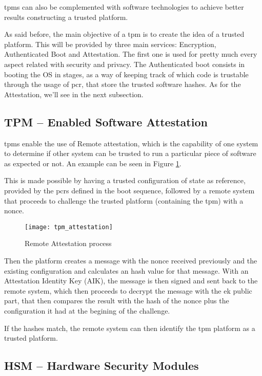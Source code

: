 \gls{tpm}s can also be complemented with software technologies to achieve better results constructing a trusted platform. 

As said before, the main objective of a \gls{tpm} is to create the idea of a trusted platform. This will be  provided by three main services: Encryption, Authenticated Boot and Attestation. The first one is used for pretty much every aspect related with security and privacy. The Authenticated boot consists in booting the OS in stages, as a way of keeping track of which code is trustable through the usage of \gls{pcr}, that store the trusted software hashes. As for the Attestation, we'll see in the next subsection.


\subsection{TPM – Enabled Software Attestation}
\label{ssec:tpm_attest}

\gls{tpm}s enable the use of Remote attestation, which is the capability of one system to determine if other system can be trusted to run a particular piece of software as expected or not. An example can be seen in Figure \ref{fig:tpm_attestation}.

This is made possible by having a trusted configuration of state as reference, provided by the \gls{pcr}s defined in the boot sequence, followed by a remote system that proceeds to challenge the trusted platform (containing the \gls{tpm}) with a nonce. 

\begin{figure}[htbp]
	\centering
	{\texttt{[image: tpm\_attestation]}}%
	\caption{Remote Attestation process}
	\label{fig:tpm_attestation}
\end{figure}

Then the platform creates a message with the nonce received previously and the existing configuration and calculates an hash value for that message. With an Attestation Identity Key (AIK), the message is then signed and sent back to the remote system, which then proceeds to decrypt the message with the \gls{ek} public part, that then compares the result with the hash of the nonce plus the configuration it had at the begining of the challenge. 

If the hashes match, the remote system can then identify the \gls{tpm} platform as a trusted platform.

\subsection{HSM – Hardware Security Modules}
\label{ssec:hsm}

